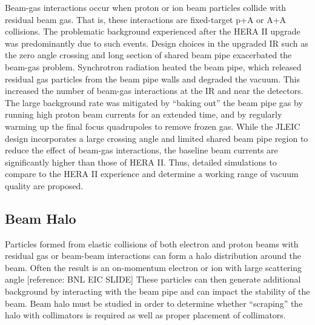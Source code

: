 Beam-gas interactions occur when proton or ion beam particles collide with residual beam gas.  That is, these interactions are fixed-target p+A or A+A collisions.  The problematic background experienced after the HERA II upgrade was predominantly due to such events.  Design choices in the upgraded IR such as the zero angle crossing and long section of shared beam pipe exacerbated the beam-gas problem.  Synchrotron radiation heated the beam pipe, which released residual gas particles from the beam pipe walls and degraded the vacuum.  This increased the number of beam-gas interactions at the IR and near the detectors.  The large background rate was mitigated by “baking out” the beam pipe gas by running high proton beam currents for an extended time, and by regularly warming up the final focus quadrupoles to remove frozen gas.  
While the JLEIC design incorporates a large crossing angle and limited shared beam pipe region to reduce the effect of beam-gas interactions, the baseline beam currents are significantly higher than those of HERA II.  Thus, detailed simulations to compare to the HERA II experience and determine a working range of vacuum quality are proposed. 

\subsection{Beam Halo}

Particles formed from elastic collisions of both electron and proton beams with residual gas or beam-beam interactions can form a halo distribution around the beam.  Often the result is an on-momentum electron or ion with large scattering angle [reference: BNL EIC SLIDE] These particles can then generate additional background by interacting with the beam pipe and can impact the stability of the beam.  Beam halo must be studied in order to determine whether “scraping” the halo with collimators is required as well as proper placement of collimators.
